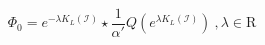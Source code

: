 \begin{equation}\label{Proll}
\Phi_0=e^{-\lambda K_L(\mathcal{I})}\star \frac{1}
{\alpha'}Q( e^{\lambda K_L(\mathcal{I})}) \ , 
\lambda \in \mathrm{R}
\end{equation}

